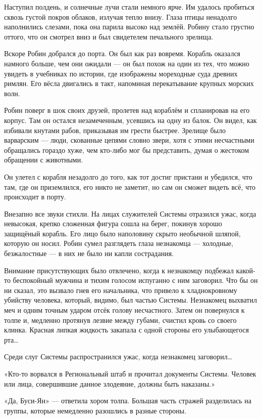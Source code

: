 \documentclass[a5paper, 9pt,
final, openany, twoside=true]{memoir}
\begin{document}
Наступил полдень, и солнечные лучи стали немного ярче. Им удалось пробиться сквозь густой покров облаков, излучая тепло внизу. Глаза птицы ненадолго наполнились слезами, пока она парила высоко над землёй. Робину стало грустно оттого, что он смотрел вниз и был свидетелем печального зрелища.\bigskip

Вскоре Робин добрался до порта. Он был как раз вовремя. Корабль оказался намного больше, чем они ожидали — он был похож на один из тех, что можно увидеть в учебниках по истории, где изображены мореходные суда древних римлян. Его вёсла двигались в такт, напоминая перекатывание крупных морских волн.

Робин поверг в шок своих друзей, пролетев над кораблём и спланировав на его корпус. Там он остался незамеченным, усевшись на одну из балок. Он видел, как избивали кнутами рабов, приказывая им грести быстрее. Зрелище было варварским — люди, скованные цепями словно звери, хотя с этими несчастными обращались гораздо хуже, чем кто-либо мог бы представить, думая о жестоком обращении с животными.

Он улетел с корабля незадолго до того, как тот достиг пристани и убедился, что там, где он приземлился, его никто не заметит, но сам он сможет видеть всё, что происходит в порту.\bigskip

Внезапно все звуки стихли. На лицах служителей Системы отразился ужас, когда невысокая, крепко сложенная фигура сошла на берег, покинув хорошо защищёный корабль. Его лицо было наполовину скрыто необычной шляпой, которую он носил. Робин сумел разглядеть глаза незнакомца — холодные, безжалостные — в них не было ни капли сострадания.

Внимание присутствующих было отвлечено, когда к незнакомцу подбежал какой-то беспокойный мужчина и тихим голосом испуганно с ним заговорил. Что бы он ни сказал, это вызвало гнев его начальника, что привело к хладнокровному убийству человека, который, видимо, был частью Системы. Незнакомец выхватил меч и одним точным ударом отсёк голову несчастного. Затем он повернулся к толпе и, медленно протянув лезвие между губами, счистил кровь со своего клинка. Красная липкая жидкость закапала с одной стороны его улыбающегося рта…

Среди слуг Системы распространился ужас, когда незнакомец заговорил…

«Кто-то ворвался в Региональный штаб и прочитал документы Системы. Человек или лица, совершившие данное злодеяние, должны быть наказаны.»

«Да, Буси-Ян» — ответила хором толпа. Большая часть стражей разделилась на группы, которые немедленно разошлись в разные стороны.
\end{document}
